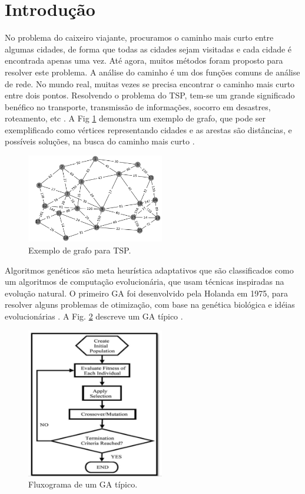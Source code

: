\documentclass[conference]{IEEEtran}
\begin{document}
\section{Introdução}
No problema do caixeiro viajante, procuramos o caminho mais curto entre algumas cidades, de forma que todas as cidades sejam visitadas e cada cidade é encontrada apenas uma vez. Até agora, muitos métodos foram proposto para resolver este problema. A análise do caminho é um dos funções comuns de análise de rede. No mundo real, muitas vezes se precisa encontrar o caminho mais curto entre dois pontos. Resolvendo o problema do TSP, tem-se um grande significado benéfico no transporte,  transmissão de informações, socorro em desastres, roteamento, etc \cite{tsp}. A Fig \ref{img:tsp_fig} demonstra um exemplo de grafo, que pode ser exemplificado como vértices representando cidades e as arestas são distâncias, e possíveis soluções, na busca do caminho mais curto \cite{GHANNAMI2021114525} .

\begin{figure}[ht]
\centering
\includegraphics[width=6cm]{tsp_fig}
\caption{\label{img:tsp_fig}Exemplo de grafo para TSP.} 
\end{figure}

Algoritmos genéticos são meta heurística adaptativos que são classificados como um algoritmos de computação evolucionária, que usam técnicas inspiradas na evolução natural. O primeiro GA foi desenvolvido pela Holanda em 1975, para resolver alguns problemas de otimização, com base na genética biológica
e idéias evolucionárias \cite{ga}. A Fig. \ref{img:ga}  descreve um GA típico \cite{m-c}.

\begin{figure}[ht]
\centering
\includegraphics[width=6cm]{ga.png}
\caption{\label{img:ga}Fluxograma de um GA típico.} 
\end{figure}
\end{document}
